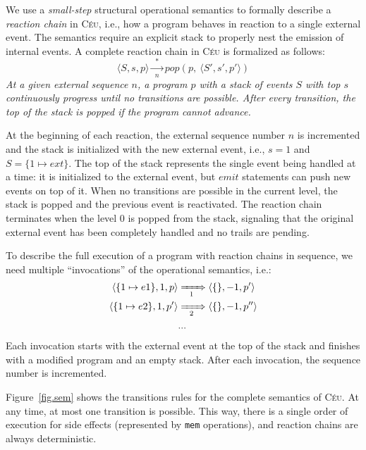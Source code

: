 \documentclass{acm_proc_article-sp}
\newcommand{\CEU}{\textsc{C\'{e}u}\xspace}
\newcommand{\code}[1] {{\small{\texttt{#1}}}}
\newcommand{\LL}{\langle}
\newcommand{\RR}{\rangle}
\newcommand{\1}{\;}
\newcommand{\2}{\;\;}
\newcommand{\3}{\;\;\;}
\newcommand{\5}{\;\;\;\;\;}
\begin{document}
We use a \emph{small-step} structural operational semantics to formally 
describe a \emph{reaction chain} in \CEU, i.e., how a program behaves in 
reaction to a single external event.
%
The semantics require an explicit stack to properly nest the emission of 
internal events.
%
A complete reaction chain in \CEU is formalized as follows:
%
$$
\LL S, s, p \RR
    \xrightarrow[~~n~~]{~~*~~}
pop(p,~\LL S', s', p' \RR)
$$
%
\emph{At a given external sequence $n$, a program $p$ with a stack of events 
$S$ with top $s$ continuously progress until no transitions are possible.
After every transition, the top of the stack is popped if the program cannot 
advance.}

At the beginning of each reaction, the external sequence number $n$ is 
incremented and the stack is initialized with the new external event, i.e., 
$s=1$ and $S=\{ 1 \mapsto ext \}$.
%
%
The top of the stack represents the single event being handled at a time:
it is initialized to the external event, but $emit$ statements can push new 
events on top of it.
When no transitions are possible in the current level, the stack is popped and 
the previous event is reactivated.
The reaction chain terminates when the level 0 is popped from the stack, 
signaling that the original external event has been completely handled and no 
trails are pending.

To describe the full execution of a program with reaction chains in sequence, 
we need multiple ``invocations'' of the operational semantics, i.e.:
%
\begin{align*}
\LL \{ 1 \mapsto e1 \}, 1, p \RR
    & \xRightarrow[~~1~~]{}
\LL \{\}, -1, p' \RR
\\
\LL \{ 1 \mapsto e2 \}, 1, p' \RR
    & \xRightarrow[~~2~~]{}
\LL \{\}, -1, p'' \RR
\\
& ...
\end{align*}
%
Each invocation starts with the external event at the top of the stack and 
finishes with a modified program and an empty stack.
After each invocation, the sequence number is incremented.

Figure~\ref{fig.sem} shows the transitions rules for the complete semantics of 
\CEU.
At any time, at most one transition is possible.
This way, there is a single order of execution for side effects (represented by 
\code{mem} operations), and reaction chains are always deterministic.
\end{document}
